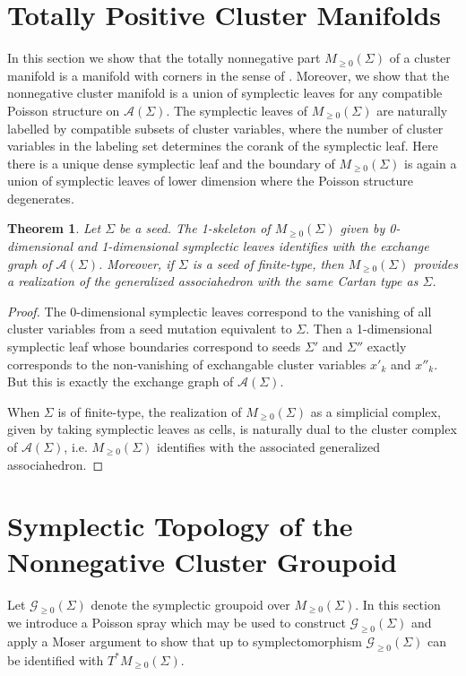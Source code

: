 \documentclass{amsart}
\newtheorem{theorem}{Theorem}[section]
\newcommand{\cA}{\mathcal{A}}
\newcommand{\cG}{\mathcal{G}}
\begin{document}
\section{Totally Positive Cluster Manifolds}
In this section we show that the totally nonnegative part $M_{\ge0}(\Sigma)$ of a cluster manifold is a manifold with corners in the sense of \cite{MR3077259}.  
Moreover, we show that the nonnegative cluster manifold is a union of symplectic leaves for any compatible Poisson structure on $\cA(\Sigma)$.  
The symplectic leaves of $M_{\ge0}(\Sigma)$ are naturally labelled by compatible subsets of cluster variables, where the number of cluster variables in the labeling set determines the corank of the symplectic leaf.
Here there is a unique dense symplectic leaf and the boundary of $M_{\ge0}(\Sigma)$ is again a union of symplectic leaves of lower dimension where the Poisson structure degenerates.

\begin{theorem}
  Let $\Sigma$ be a seed.  
  The 1-skeleton of $M_{\ge0}(\Sigma)$ given by 0-dimensional and 1-dimensional symplectic leaves identifies with the exchange graph of $\cA(\Sigma)$.  
  Moreover, if $\Sigma$ is a seed of finite-type, then $M_{\ge0}(\Sigma)$ provides a realization of the generalized associahedron with the same Cartan type as $\Sigma$.
\end{theorem}
\begin{proof}
  The 0-dimensional symplectic leaves correspond to the vanishing of all cluster variables from a seed mutation equivalent to $\Sigma$.  
  Then a 1-dimensional symplectic leaf whose boundaries correspond to seeds $\Sigma'$ and $\Sigma''$ exactly corresponds to the non-vanishing of exchangable cluster variables $x'_k$ and $x''_k$.
  But this is exactly the exchange graph of $\cA(\Sigma)$.

  When $\Sigma$ is of finite-type, the realization of $M_{\ge0}(\Sigma)$ as a simplicial complex, given by taking symplectic leaves as cells, is naturally dual to the cluster complex of $\cA(\Sigma)$, i.e. $M_{\ge0}(\Sigma)$ identifies with the associated generalized associahedron.
\end{proof}

\section{Symplectic Topology of the Nonnegative Cluster Groupoid}
Let $\cG_{\ge0}(\Sigma)$ denote the symplectic groupoid over $M_{\ge0}(\Sigma)$.  
In this section we introduce a Poisson spray which may be used to construct $\cG_{\ge0}(\Sigma)$ and apply a Moser argument to show that up to symplectomorphism $\cG_{\ge0}(\Sigma)$ can be identified with $T^*M_{\ge0}(\Sigma)$.



\end{document}
